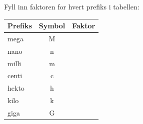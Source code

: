 %
Fyll inn faktoren for hvert prefiks i tabellen:
\begin{center}
\renewcommand{\arraystretch}{1.3}
\begin{tabular}{|l|c|c|}
\hline
\rowcolor{blue!20!black!10}
\textbf{Prefiks} & \textbf{Symbol} & \textbf{Faktor} \\
\hline
mega  & M & \\[4pt]
nano  & n & \\[4pt]
milli & m & \\[4pt]
centi & c & \\[4pt]
hekto & h & \\[4pt]
kilo  & k & \\[4pt]
giga  & G & \\[4pt]
\hline
\end{tabular}
\end{center}
